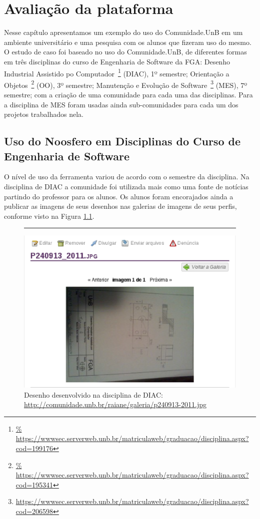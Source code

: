 \chapter{Avaliação da plataforma}

Nesse capítulo apresentamos um exemplo do uso do Comunidade.UnB em um ambiente
universitário e uma pesquisa com os alunos que fizeram uso do mesmo.
%
O estudo de caso foi baseado no uso do Comunidade.UnB, de diferentes formas em
três disciplinas do curso de Engenharia de Software da FGA:
%
Desenho Industrial Assistido po Computador~\footnote{\url{%
https://wwwsec.serverweb.unb.br/matriculaweb/graduacao/disciplina.aspx?cod=199176}} (DIAC), 1º semestre;
%
Orientação a Objetos~\footnote{\url{%
https://wwwsec.serverweb.unb.br/matriculaweb/graduacao/disciplina.aspx?cod=195341}}
(OO), 3º semestre;
%
Manutenção e Evolução de Software~\footnote{\url{
https://wwwsec.serverweb.unb.br/matriculaweb/graduacao/disciplina.aspx?cod=206598}}
(MES), 7º semestre;
%
com a criação de uma comunidade para cada uma das disciplinas. Para a disciplina de
MES foram usadas ainda sub-comunidades para cada um dos projetos trabalhados nela.

\section{Uso do Noosfero em Disciplinas do Curso de Engenharia de Software}
\label{mes-unb}

O nível de uso da ferramenta variou de acordo com o semestre da disciplina. Na
disciplina de DIAC a comunidade foi utilizada mais como uma fonte de notícias
partindo do professor para os alunos. Os alunos foram encorajados ainda a publicar
as imagens de seus desenhos nas galerias de imagens de seus perfis, conforme
visto na Figura \ref{imagem-diac}.

\begin{figure}[h!]
    \centering
		\rule{1cm}{1cm}
    \includegraphics[keepaspectratio=true,scale=0.65]
      {figuras/imagem-diac.eps}
    \caption{Desenho desenvolvido na disciplina de DIAC:\newline
\url{http://comunidade.unb.br/raiane/galeria/p240913-2011.jpg}}
    \label{imagem-diac}
\end{figure}

